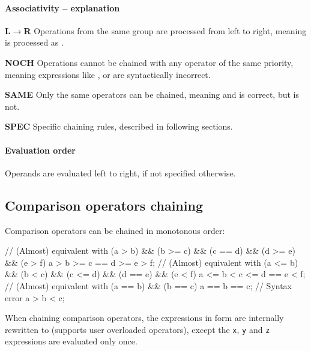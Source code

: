 \paragraph{Associativity -- explanation}
\begin{compactitem}
	\item \textbf{L$\rightarrow$R} Operations from the same group are processed from left to right, meaning  is processed as .
	\item \textbf{NOCH} Operations cannot be chained with any operator of the same priority, meaning expressions like ,  or  are syntactically incorrect.
	\item \textbf{SAME} Only the same operators can be chained, meaning  and  is correct, but  is not.
	\item \textbf{SPEC} Specific chaining rules, described in following sections.
\end{compactitem}

\paragraph{Evaluation order}
Operands are evaluated left to right, if not specified otherwise.

\subsection{Comparison operators chaining} Comparison operators can be chained in monotonous order:

\begin{code}
// (Almost) equivalent with (a > b) && (b >= c) && (c == d) && (d >= e) && (e > f)
a > b >= c == d >= e > f;
// (Almost) equivalent with (a <= b) && (b < c) && (c <= d) && (d == e) && (e < f)
a <= b < c <= d == e < f;
// (Almost) equivalent with (a == b) && (b == c)
a == b == c;
// Syntax error
a > b < c;
\end{code}

When chaining comparison operators, the expressions in form  are internally rewritten to  (supports user overloaded operators), except the \verb|x|, \verb|y| and \verb|z| expressions are evaluated only once.

